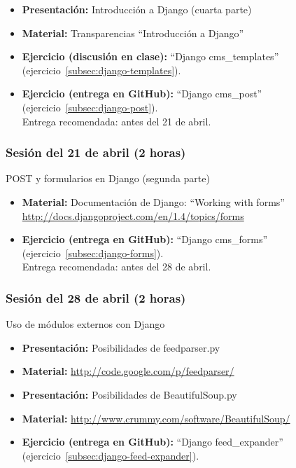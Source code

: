 \documentclass[a4paper,12pt]{article}
\begin{document}
\begin{itemize}
    \item \textbf{Presentación:} Introducción a Django (cuarta parte)
    \item \textbf{Material:} Transparencias ``Introducción a Django''
     \item \textbf{Ejercicio (discusión en clase):} ``Django cms\_templates'' (ejercicio~\ref{subsec:django-templates}). \\
    \item \textbf{Ejercicio (entrega en GitHub):} ``Django cms\_post'' (ejercicio~\ref{subsec:django-post}).\\
  Entrega recomendada: antes del 21 de abril.
\end{itemize}

\subsubsection{Sesión del 21 de abril (2 horas)}

POST y formularios en Django (segunda parte)

\begin{itemize}

    \item \textbf{Material:} Documentación de Django: ``Working with forms'' \\
      \url{http://docs.djangoproject.com/en/1.4/topics/forms}
    \item \textbf{Ejercicio (entrega en GitHub):} ``Django cms\_forms'' (ejercicio~\ref{subsec:django-forms}). \\
  Entrega recomendada: antes del 28 de abril.
\end{itemize}

\subsubsection{Sesión del 28 de abril (2 horas)}

Uso de módulos externos con Django

\begin{itemize}
  \item \textbf{Presentación:} Posibilidades de feedparser.py
  \item \textbf{Material:} \url{http://code.google.com/p/feedparser/}
  \item \textbf{Presentación:} Posibilidades de BeautifulSoup.py
  \item \textbf{Material:} \url{http://www.crummy.com/software/BeautifulSoup/}
  \item \textbf{Ejercicio (entrega en GitHub):} ``Django feed\_expander'' (ejercicio~\ref{subsec:django-feed-expander}).
\end{itemize}
\end{document}

